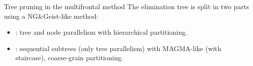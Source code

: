 \begin{frame}{Tree pruning in the multifrontal method}
  The elimination tree is split in two parts using a NG\&Geist-like method:
  \begin{itemize}
  \item<2-> : tree and node parallelism with hierarchical partitioning. 
  \item<4-> : sequential subtrees (only tree parallelism) with
    MAGMA-like (\alert{with staircase}), coarse-grain partitioning.
  \end{itemize}

  \vspace{0.5cm}

  \begin{center}
  \end{center}



\end{frame}
